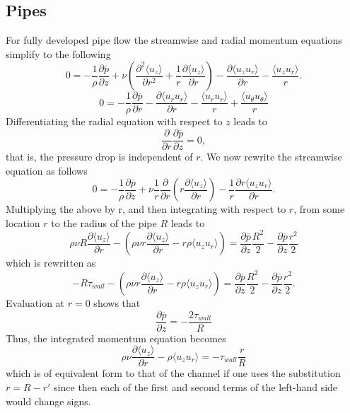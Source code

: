 \documentclass[oneside,a4paper,11pt]{report}
\newcommand{\pavg}{\overline{p}}
\begin{document}
\subsection{Pipes}

For fully developed pipe flow the streamwise and radial momentum equations simplify to the following
\begin{equation}
0 =  -\frac{1}{\rho} \frac{\partial \pavg}{\partial z} + \nu \left ( \frac{\partial^2 \langle u_z \rangle}{\partial r^2} + \frac{1}{r} \frac{\partial \langle u_z \rangle}{\partial r} \right ) - \frac{\partial \langle u_z u_r \rangle}{\partial r} - \frac{\langle u_z u_r \rangle}{r}.
\end{equation}
\begin{equation}
0 = -\frac{1}{\rho} \frac{\partial \pavg}{\partial r} - \frac{\partial \langle u_ru_r \rangle}{\partial r} - \frac{\langle u_ru_r \rangle}{r} + \frac{\langle u_\theta u_\theta \rangle}{r}
\end{equation} 
Differentiating the radial equation with respect to $z$ leads to
\begin{equation}
\frac{\partial}{\partial r} \frac{\partial \pavg}{\partial z} = 0,
\end{equation}
that is, the pressure drop is independent of $r$. 
We now rewrite the streamwise equation as follows
\begin{equation}
0 =  -\frac{1}{\rho} \frac{\partial \pavg}{\partial z} + \nu \frac{1}{r} \frac{\partial}{\partial r} \left (r \frac{\partial \langle u_z \rangle}{\partial r} \right ) - \frac{1}{r} \frac{\partial r \langle u_z u_r \rangle}{\partial r}.
\end{equation}
Multiplying the above by r, and then integrating with respect to $r$, from some location $r$ to the radius of the pipe $R$ leads to
\begin{equation}
\rho \nu R \frac{\partial \langle u_z \rangle}{\partial r} - \left ( \rho \nu r \frac{\partial \langle u_z \rangle}{\partial r} - r \rho \langle u_z u_r \rangle \right )= \frac{\partial \pavg}{\partial z} \frac{R^2}{2} - \frac{\partial \pavg}{\partial z} \frac{r^2}{2}
\end{equation}
which is rewritten as
\begin{equation}
-R \tau_{wall} - \left ( \rho \nu r \frac{\partial \langle u_z \rangle}{\partial r} - r \rho \langle u_z u_r \rangle \right )= \frac{\partial \pavg}{\partial z} \frac{R^2}{2} - \frac{\partial \pavg}{\partial z} \frac{r^2}{2}.
\end{equation}
Evaluation at $r = 0$ shows that
\begin{equation}
\frac{\partial \pavg}{\partial z} = -\frac{2\tau_{wall}}{R}
\end{equation}
Thus, the integrated momentum equation becomes
\begin{equation}
\rho \nu \frac{\partial \langle u_z \rangle}{\partial r} - \rho \langle u_z u_r \rangle = -\tau_{wall} \frac{r}{R}
\end{equation}
which is of equivalent form to that of the channel if one uses the substitution $r = R - r'$ since then each of the first and second terms of the left-hand side would change signs. 
\end{document}
